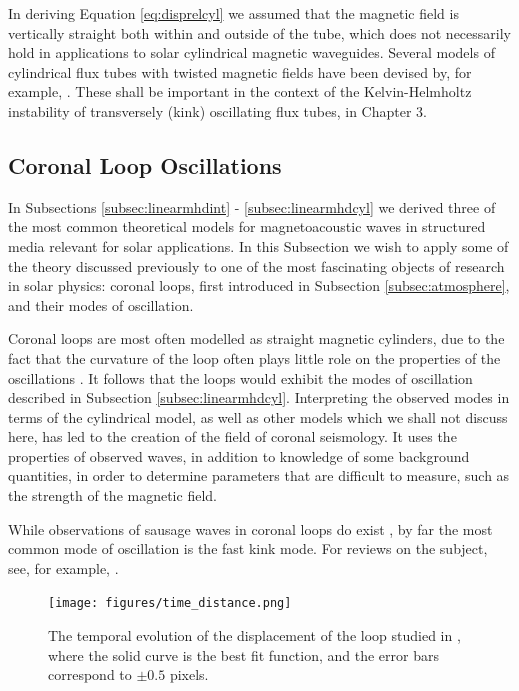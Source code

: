 In deriving Equation \eqref{eq:disprelcyl} we assumed that the magnetic field is vertically straight both within and outside of the tube, which does not necessarily hold in applications to solar cylindrical magnetic waveguides.
Several models of cylindrical flux tubes with twisted magnetic fields have been devised by, for example, \cite{Bennett1999, Erdelyi2006, Erdelyi2007, Ruderman2007, Erdelyi2010, Vasheghani2010, Ruderman2015a, Ruderman2015b}.
These shall be important in the context of the Kelvin-Helmholtz instability of transversely (kink) oscillating flux tubes, in Chapter 3.

\subsection{Coronal Loop Oscillations}
\label{subsec:loops}

In Subsections \ref{subsec:linearmhdint} - \ref{subsec:linearmhdcyl} we derived three of the most common theoretical models for magnetoacoustic waves in structured media relevant for solar applications.
In this Subsection we wish to apply some of the theory discussed previously to one of the most fascinating objects of research in solar physics: coronal loops, first introduced in Subsection \ref{subsec:atmosphere}, and their modes of oscillation.

Coronal loops are most often modelled as straight magnetic cylinders, due to the fact that the curvature of the loop often plays little role on the properties of the oscillations \citep{TVD2004}.
It follows that the loops would exhibit the modes of oscillation described in Subsection \ref{subsec:linearmhdcyl}.
Interpreting the observed modes in terms of the cylindrical model, as well as other models which we shall not discuss here, has led to the creation of the field of coronal seismology.
It uses the properties of observed waves, in addition to knowledge of some background quantities, in order to determine parameters that are difficult to measure, such as the strength of the magnetic field.

While observations of sausage waves in coronal loops do exist \citep{Nakariakov2003, Srivastava2008}, by far the most common mode of oscillation is the fast kink mode.
For reviews on the subject, see, for example, \cite{Nakariakov2005, Ruderman2009, DeMoortel2012}.

\begin{figure}[t]
\centering
\texttt{[image: figures/time\_distance.png]}
\caption{The temporal evolution of the displacement of the loop studied in \cite{Nakariakov1999}, where the solid curve is the best fit function, and the error bars correspond to $\pm 0.5$ pixels.
}
\label{fig:time_distance}
\end{figure}

